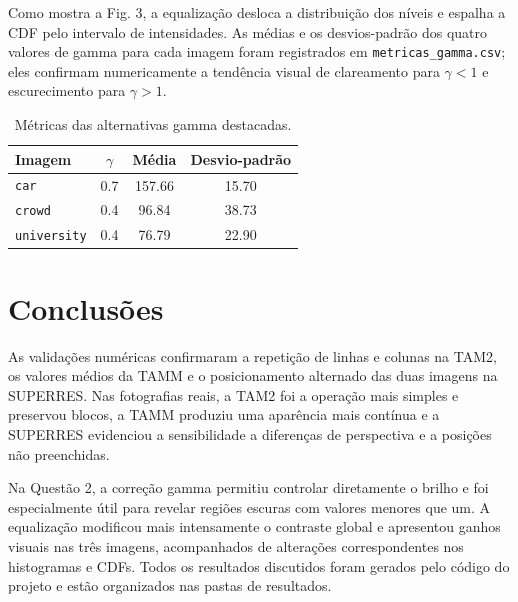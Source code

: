 \documentclass[conference]{IEEEtran}
\begin{document}
Como mostra a Fig. 3, a equalização desloca a distribuição dos níveis e espalha a CDF pelo intervalo de intensidades. As médias e os desvios-padrão dos quatro valores de gamma para cada imagem foram registrados em \texttt{metricas\_gamma.csv}; eles confirmam numericamente a tendência visual de clareamento para $\gamma<1$ e escurecimento para $\gamma>1$.

\begin{table}[!t]
\caption{Métricas das alternativas gamma destacadas.}
\label{tab:metricas}
\centering
\begin{tabular}{lccc}
\toprule
Imagem & $\gamma$ & Média & Desvio-padrão\\
\midrule
\texttt{car} & 0.7 & 157.66 & 15.70\\
\texttt{crowd} & 0.4 & 96.84 & 38.73\\
\texttt{university} & 0.4 & 76.79 & 22.90\\
\bottomrule
\end{tabular}
\end{table}

\section{Conclusões}
As validações numéricas confirmaram a repetição de linhas e colunas na TAM2, os valores médios da TAMM e o posicionamento alternado das duas imagens na SUPERRES. Nas fotografias reais, a TAM2 foi a operação mais simples e preservou blocos, a TAMM produziu uma aparência mais contínua e a SUPERRES evidenciou a sensibilidade a diferenças de perspectiva e a posições não preenchidas.

Na Questão 2, a correção gamma permitiu controlar diretamente o brilho e foi especialmente útil para revelar regiões escuras com valores menores que um. A equalização modificou mais intensamente o contraste global e apresentou ganhos visuais nas três imagens, acompanhados de alterações correspondentes nos histogramas e CDFs. Todos os resultados discutidos foram gerados pelo código do projeto e estão organizados nas pastas de resultados.
\end{document}
